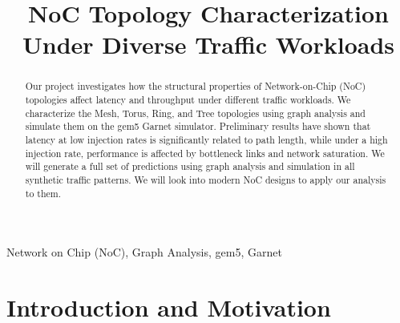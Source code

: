 \documentclass[conference]{IEEEtran}
\begin{document}
\title{NoC Topology Characterization Under Diverse Traffic Workloads
}

\author{
\and
{}
}

\maketitle

\begin{abstract}
Our project investigates how the structural properties of Network-on-Chip (NoC) topologies affect latency and throughput under different traffic workloads. We characterize the Mesh, Torus, Ring, and Tree topologies using graph analysis and simulate them on the gem5 Garnet simulator. Preliminary results have shown that latency at low injection rates is significantly related to path length, while under a high injection rate, performance is affected by bottleneck links and network saturation. We will generate a full set of predictions using graph analysis and simulation in all synthetic traffic patterns. We will look into modern NoC designs to apply our analysis to them.
\end{abstract}

\begin{IEEEkeywords}
Network on Chip (NoC), Graph Analysis, gem5, Garnet
\end{IEEEkeywords}

\section{Introduction and Motivation}
\end{document}
